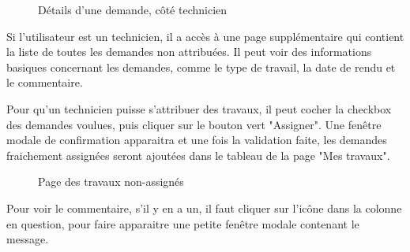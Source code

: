 \documentclass[
    iai, %
    eai, %
]{heig-tb}
\begin{document}
\begin{figure}[h!]
  \caption{Détails d'une demande, côté technicien}
\end{figure}



Si l'utilisateur est un technicien, il a accès à une page supplémentaire qui contient la liste de toutes les demandes non attribuées.
Il peut voir des informations basiques concernant les demandes, comme le type de travail, la date de rendu et le commentaire.

Pour qu'un technicien puisse s'attribuer des travaux, il peut cocher la checkbox des demandes voulues, puis cliquer sur le bouton vert "Assigner".
Une fenêtre modale de confirmation apparaitra et une fois la validation faite, les demandes fraichement assignées seront ajoutées dans le tableau de la page "Mes travaux".

\begin{figure}[h!]
  \caption{Page des travaux non-assignés}
\end{figure}

Pour voir le commentaire, s'il y en a un, il faut cliquer sur l'icône dans la colonne en question, pour faire apparaitre une petite fenêtre modale contenant le message.
\end{document}
